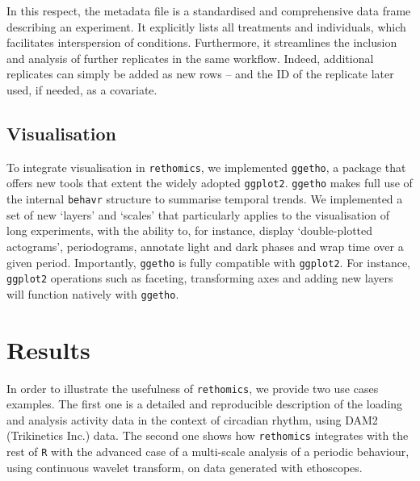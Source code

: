 \documentclass[10pt,letterpaper]{article}\usepackage[]{graphicx}\usepackage[]{color}
\begin{document}
In this respect, the metadata file is a standardised and comprehensive data frame describing an experiment.
It explicitly lists all treatments and individuals, which facilitates interspersion of conditions.
Furthermore, it streamlines the inclusion and analysis of further replicates in the same workflow.
Indeed, additional replicates can simply be added as new rows -- and the ID of the replicate later used, if needed, as a covariate.	


\subsection*{Visualisation}

To integrate visualisation in \texttt{rethomics}, we implemented \texttt{ggetho},
a package that offers new tools that extent the widely adopted \texttt{ggplot2}\cite{wickham_ggplot2:_2016}.
\texttt{ggetho} makes full use of the internal \texttt{behavr} structure to summarise temporal trends.
We implemented a set of new `layers' and `scales' that particularly applies to the visualisation of long experiments, with the ability to, for instance, display `double-plotted actograms', periodograms, annotate light and dark phases and wrap time over a given period. 
Importantly, \texttt{ggetho} is fully compatible with \texttt{ggplot2}. 
For instance, \texttt{ggplot2} operations such as faceting, transforming axes and adding new layers will function natively with \texttt{ggetho}.




\section*{Results}

In order to illustrate the usefulness of \texttt{rethomics}, we provide two use cases examples.
The first one is a detailed and reproducible description of the loading and analysis activity data in the context of circadian rhythm, using DAM2 (Trikinetics Inc.) data.
The second one shows how \texttt{rethomics} integrates with the rest of \texttt{R} with the advanced case of a multi-scale analysis of a periodic behaviour, using continuous wavelet transform, on data generated with ethoscopes\cite{geissmann_ethoscopes:_2017}.
\end{document}

